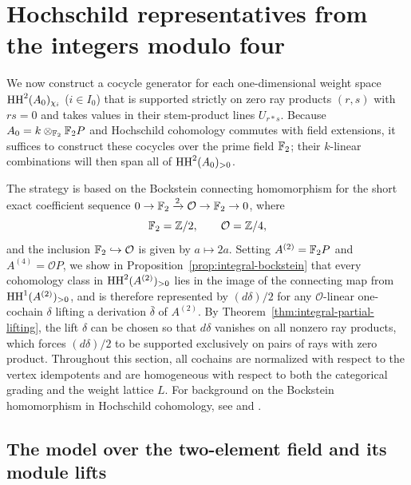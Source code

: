 \section{Hochschild representatives from the integers modulo four}
\label{sec:integral-deformations}

We now construct a cocycle generator for each one-dimensional weight space $\operatorname{HH}^2(A_0)_{\chi_i}$ ($i\in I_0$) that is supported strictly on zero ray products $(r,s)$ with $rs=0$ and takes values in their stem-product lines $U_{r*s}$. Because $A_0=k\otimes_{\mathbb F_2}\mathbb F_2P$ and Hochschild cohomology commutes with field extensions, it suffices to construct these cocycles over the prime field $\mathbb F_2$; their $k$-linear combinations will then span all of $\operatorname{HH}^2(A_0)_{>0}$.

The strategy is based on the Bockstein connecting homomorphism for the short exact coefficient sequence $0\to\mathbb F_2\xrightarrow{2}\mathcal O\to\mathbb F_2\to0$, where
\[
  \mathbb F_2=\mathbb Z/2,\qquad \mathcal O=\mathbb Z/4,
\]
and the inclusion $\mathbb F_2\hookrightarrow\mathcal O$ is given by $a\mapsto 2a$. Setting $A^{(2)}=\mathbb F_2P$ and $A^{(4)}=\mathcal OP$, we show in Proposition~\ref{prop:integral-bockstein} that every cohomology class in $\operatorname{HH}^2(A^{(2)})_{>0}$ lies in the image of the connecting map from $\operatorname{HH}^1(A^{(2)})_{>0}$, and is therefore represented by $(d\delta)/2$ for any $\mathcal O$-linear one-cochain $\delta$ lifting a derivation $\bar\delta$ of $A^{(2)}$. By Theorem~\ref{thm:integral-partial-lifting}, the lift $\delta$ can be chosen so that $d\delta$ vanishes on all nonzero ray products, which forces $(d\delta)/2$ to be supported exclusively on pairs of rays with zero product. Throughout this section, all cochains are normalized with respect to the vertex idempotents and are homogeneous with respect to both the categorical grading and the weight lattice $L$. For background on the Bockstein homomorphism in Hochschild cohomology, see \cite[Sections~4--5]{GerstenhaberSchack} and \cite[Section~2]{Linckelmann}.

\subsection{The model over the two-element field and its module lifts}

